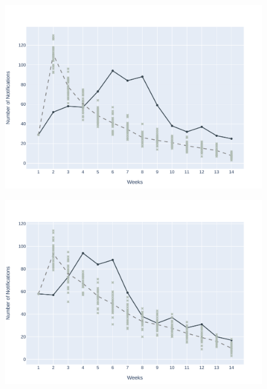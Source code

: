 \begin{figure}[!ht]
\begin{minipage}[c]{.45\textwidth}
	\end{minipage}
	\\
	\begin{minipage}[c]{.45\textwidth}
		\centering
		\includegraphics[scale=0.4]{images/experiments-lim/LIM-2020-06-21.pdf} \\
		\vspace{-0.3cm}
	\end{minipage}
	\hspace{0.5cm}
	\begin{minipage}[c]{.45\textwidth}
		\centering
		\includegraphics[scale=0.4]{images/experiments-lim/LIM-2020-07-05.pdf} \\

\end{minipage}
\end{figure}
